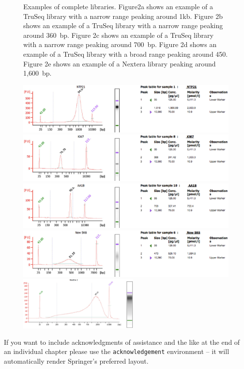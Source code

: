 \documentclass[graybox]{svmult}
\begin{document}
\begin{figure}
\caption{Examples of complete libraries. Figure2a shows an example of a TruSeq library with a narrow range peaking around 1kb. Figure 2b shows an example of a TruSeq library with a narrow range peaking around 360~bp. Figure 2c shows an example of a TruSeq library with a narrow range peaking around 700~bp. Figure 2d shows an example of a TruSeq library with a broad range peaking around 450. Figure 2e shows an example of a Nextera library peaking around 1,600~bp.  }
\includegraphics[width=12cm]{imgs/image2.eps}
\includegraphics[width=12cm]{imgs/image3.eps}
\includegraphics[width=12cm]{imgs/image4.eps}
\includegraphics[width=12cm]{imgs/image5.eps}
\includegraphics[width=6cm]{imgs/image6.eps}
%
\caption{ }
\label{fig:2}       %
\end{figure}


%
\begin{acknowledgement}
If you want to include acknowledgments of assistance and the like at the end of an individual chapter please use the \verb|acknowledgement| environment -- it will automatically render Springer's preferred layout.
\end{acknowledgement}
%


\end{document}
